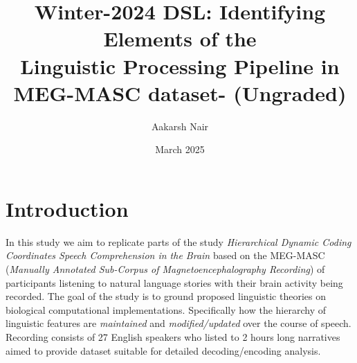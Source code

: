 \documentclass{tufte-handout}
\title{Winter-2024 DSL: Identifying Elements of the\\ Linguistic Processing Pipeline in MEG-MASC dataset- (Ungraded)}
\author{Aakarsh Nair}
\date{March 2025}
\begin{document}
\maketitle

\iffalse
A complete project proposal should contain the following elements: ▷ concise and descriptive title, information about contributors ▷ an introduction laying out the research question, providing the essential context and background information about the topic ▷ a clear statement of the objective: research question to be answered, result to replicate ▷ preliminary literature review showing that you have an idea of what is out there in terms of both methods and datasets, and where to look for ideas and examples in case you get stuck ▷ considerations of scope: which aspects will be included in and excluded from the study, and what are the reasons for the decisions? (most commonly: data availability, time constraints) ▷ proposed methodology: what are your plans for data acquisition, and which techniques are you planning to apply to your data in order to answer the research question? ▷ preliminary project plan laying out the work each project contributor is planning to do in which week, and how this means the work will be completed as the deadline approaches ▷ a statement of the expected outcomes: what will we able to learn from the project results? What could we conclude from a failed replication or lack of evidence for your hypothesis?

\fi

\section{Introduction}

In this study we aim to replicate parts of the study \citep{Gwilliams2024.04.19.590280} \emph{Hierarchical Dynamic Coding Coordinates Speech Comprehension in the Brain} based on the MEG-MASC \citep{gwilliams2022megmaschighqualitymagnetoencephalographydataset} (\emph{Manually Annotated Sub-Corpus of Magnetoencephalography Recording}) of participants listening to natural language stories with their brain activity being recorded. The goal of the study is to ground proposed linguistic theories on biological computational implementations. Specifically how the hierarchy of linguistic features are \emph{maintained} and \emph{modified/updated} over the course of speech. Recording consists of 27 English speakers who listed to 2 hours long narratives aimed to provide dataset suitable for detailed decoding/encoding analysis. 
\end{document}
